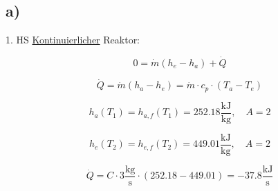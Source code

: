 

\subsection*{a)}
1. HS \underline{Kontinuierlicher} Reaktor:

\[
0 = \dot{m}(h_e - h_a) + \dot{Q}
\]

\[
\dot{Q} = \dot{m}(h_a - h_e) = \dot{m} \cdot c_p \cdot (T_a - T_e)
\]

\[
h_a(T_1) = h_{a,f}(T_1) = 252.18 \frac{\text{kJ}}{\text{kg}}, \quad A = 2
\]

\[
h_e(T_2) = h_{e,f}(T_2) = 449.01 \frac{\text{kJ}}{\text{kg}}, \quad A = 2
\]

\[
\dot{Q} = C \cdot 3 \frac{\text{kg}}{\text{s}} \cdot (252.18 - 449.01) = -37.8 \frac{\text{kJ}}{\text{s}}
\]